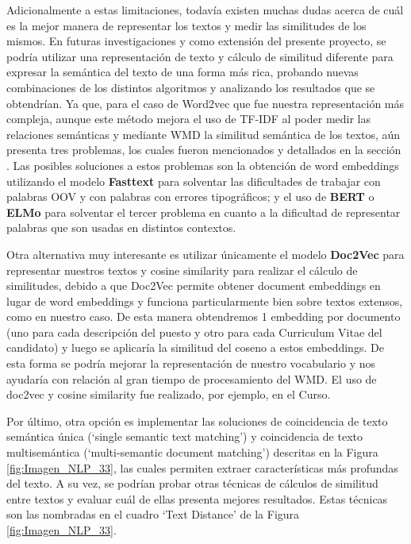 \documentclass[12pt,a4paper]{article}
\begin{document}
\begin{sloppypar}
Adicionalmente a estas limitaciones, todavía existen muchas dudas acerca de cuál es la mejor manera de representar los textos y medir las similitudes de los mismos. En futuras investigaciones y como extensión del presente proyecto, se podría utilizar una representación de texto y cálculo de similitud diferente para expresar la semántica del texto de una forma más rica, probando nuevas combinaciones de los distintos algoritmos y analizando los resultados que se obtendrían. Ya que, para el caso de Word2vec que fue nuestra representación más compleja, aunque este método mejora el uso de TF-IDF al poder medir las relaciones semánticas y mediante WMD la similitud semántica de los textos, aún presenta tres problemas, los cuales fueron mencionados y detallados en la sección \textit{}. Las posibles soluciones a estos problemas son la obtención de word embeddings utilizando el modelo \textbf{Fasttext} para solventar las dificultades de trabajar con palabras OOV y con palabras con errores tipográficos; y el uso de \textbf{BERT} o \textbf{ELMo} para solventar el tercer problema en cuanto a la dificultad de representar palabras que son usadas en distintos contextos.


Otra alternativa muy interesante es utilizar únicamente el modelo \textbf{Doc2Vec} para representar nuestros textos y cosine similarity para realizar el cálculo de similitudes, debido a que Doc2Vec permite obtener document embeddings en lugar de word embeddings y funciona particularmente bien sobre textos extensos\cite{doc2vec_bib}, como en nuestro caso. De esta manera obtendremos 1 embedding por documento (uno para cada descripción del puesto y otro para cada Curriculum Vitae del candidato) y luego se aplicaría la similitud del coseno a estos embeddings. De esta forma se podría mejorar la representación de nuestro vocabulario y nos ayudaría con relación al gran tiempo de procesamiento del WMD. El uso de doc2vec y cosine similarity fue realizado, por ejemplo, en el Curso\cite{NLP_28}.

Por último, otra opción es implementar las soluciones de coincidencia de texto semántica única (‘single semantic text matching’) y coincidencia de texto multisemántica (‘multi-semantic document matching’) descritas en la Figura \ref{fig:Imagen_NLP_33}, las cuales permiten extraer características más profundas del texto\cite{similarity_survey}. A su vez, se podrían probar otras técnicas de cálculos de similitud entre textos y evaluar cuál de ellas presenta mejores resultados. Estas técnicas son las nombradas en el cuadro ‘Text Distance’ de la Figura \ref{fig:Imagen_NLP_33}. 


\end{sloppypar}
\end{document}
